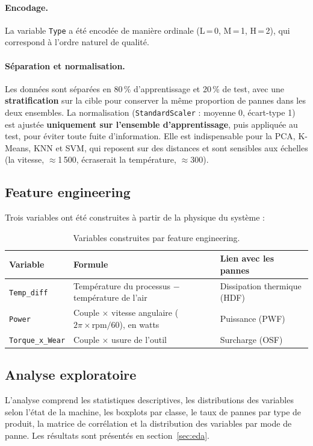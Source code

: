 \documentclass[12pt,a4paper]{article}
\begin{document}
\paragraph{Encodage.} La variable \texttt{Type} a été encodée de manière ordinale (L\,=\,0, M\,=\,1, H\,=\,2), qui correspond à l'ordre naturel de qualité.

\paragraph{Séparation et normalisation.} Les données sont séparées en 80\,\% d'apprentissage et 20\,\% de test, avec une \textbf{stratification} sur la cible pour conserver la même proportion de pannes dans les deux ensembles. La normalisation (\texttt{StandardScaler} : moyenne 0, écart-type 1) est ajustée \textbf{uniquement sur l'ensemble d'apprentissage}, puis appliquée au test, pour éviter toute fuite d'information. Elle est indispensable pour la PCA, K-Means, KNN et SVM, qui reposent sur des distances et sont sensibles aux échelles (la vitesse, $\approx$1\,500, écraserait la température, $\approx$300).

\subsection{Feature engineering}
Trois variables ont été construites à partir de la physique du système :

\begin{table}[H]
\centering
\small
\begin{tabularx}{\textwidth}{@{}l X X@{}}
\toprule
\textbf{Variable} & \textbf{Formule} & \textbf{Lien avec les pannes} \\
\midrule
\texttt{Temp\_diff} & Température du processus $-$ température de l'air & Dissipation thermique (HDF) \\
\texttt{Power} & Couple $\times$ vitesse angulaire ($2\pi \times \text{rpm}/60$), en watts & Puissance (PWF) \\
\texttt{Torque\_x\_Wear} & Couple $\times$ usure de l'outil & Surcharge (OSF) \\
\bottomrule
\end{tabularx}
\caption{Variables construites par feature engineering.}
\end{table}

\subsection{Analyse exploratoire}
L'analyse comprend les statistiques descriptives, les distributions des variables selon l'état de la machine, les boxplots par classe, le taux de pannes par type de produit, la matrice de corrélation et la distribution des variables par mode de panne. Les résultats sont présentés en section~\ref{sec:eda}.
\end{document}
